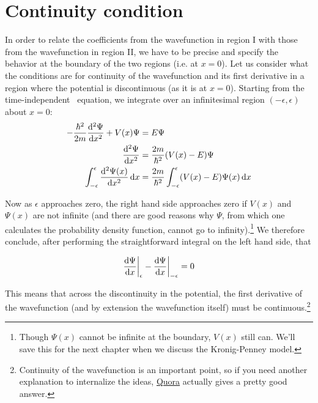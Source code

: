 \section{Continuity condition}
In order to relate the coefficients from the wavefunction in region I with those from the wavefunction in region II, we have to be precise and specify the behavior at the boundary of the two regions (i.e. at $x=0$). Let us consider what the conditions are for continuity of the wavefunction and its first derivative in a region where the potential is discontinuous (as it is at $x=0$). Starting from the time-independent \Sch\ equation, we integrate over an infinitesimal region $(-\epsilon, \epsilon)$ about $x=0$:
\begin{align*}
	-\frac{\hbar^2}{2m} \dv[2]{\Psi}{x} + V(x)\Psi &= E\Psi \\
	\dv[2]{\Psi}{x} &= \frac{2m}{\hbar^2}(V(x) - E)\Psi \\
	\int_{-\epsilon}^{\epsilon} \dv[2]{\Psi(x)}{x} \dd{x} &= \frac{2m}{\hbar^2} \int_{-\epsilon}^{\epsilon} (V(x)-E)\Psi(x) \dd{x} 
\end{align*}

Now as $\epsilon$ approaches zero, the right hand side approaches zero if $V(x)$ and $\Psi(x)$ are not infinite (and there are good reasons why $\Psi$, from which one calculates the probability density function, cannot go to infinity).\footnote{Though $\Psi(x)$ cannot be infinite at the boundary, $V(x)$ still can. We'll save this for the next chapter when we discuss the Kronig-Penney model.} We therefore conclude, after performing the straightforward integral on the left hand side, that
\begin{tcolorbox}[title = Continuity of the wavefunction] \vspace{-2ex}
	\begin{equation}
		\dv{\Psi}{x} \bigg|_{\epsilon} - \dv{\Psi}{x} \bigg|_{-\epsilon} = 0 \label{eq:cont-dx}
	\end{equation}
\end{tcolorbox}

This means that across the discontinuity in the potential, the first derivative of the wavefunction (and by extension the wavefunction itself) must be continuous.\footnote{Continuity of the wavefunction is an important point, so if you need another explanation to internalize the ideas, \href{https://www.quora.com/Why-does-the-wave-function-have-to-be-continuous}{Quora} actually gives a pretty good answer.} 


